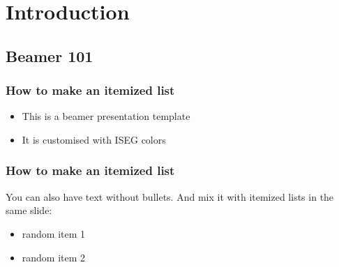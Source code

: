 

\section{Introduction} 

\subsection{Beamer 101}


\begin{frame} 
	\frametitle{How to make an itemized list}

\begin{itemize} 

\item This is a beamer presentation template

\item It is customised with ISEG colors

\end{itemize}

\end{frame}


\begin{frame} 
	\frametitle{How to make an itemized list}

You can also have text without bullets. And mix it with itemized lists in the same slide:

\begin{itemize} 

\item random item 1

\item random item 2

\end{itemize}

\end{frame}


